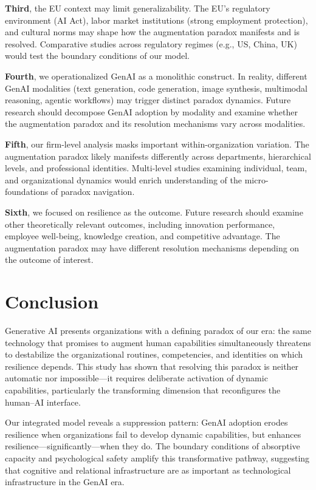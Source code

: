 \documentclass[12pt, a4paper]{article}
\begin{document}
\textbf{Third}, the EU context may limit generalizability. The EU's regulatory environment (AI Act), labor market institutions (strong employment protection), and cultural norms may shape how the augmentation paradox manifests and is resolved. Comparative studies across regulatory regimes (e.g., US, China, UK) would test the boundary conditions of our model.

\textbf{Fourth}, we operationalized GenAI as a monolithic construct. In reality, different GenAI modalities (text generation, code generation, image synthesis, multimodal reasoning, agentic workflows) may trigger distinct paradox dynamics. Future research should decompose GenAI adoption by modality and examine whether the augmentation paradox and its resolution mechanisms vary across modalities.

\textbf{Fifth}, our firm-level analysis masks important within-organization variation. The augmentation paradox likely manifests differently across departments, hierarchical levels, and professional identities. Multi-level studies examining individual, team, and organizational dynamics would enrich understanding of the micro-foundations of paradox navigation.

\textbf{Sixth}, we focused on resilience as the outcome. Future research should examine other theoretically relevant outcomes, including innovation performance, employee well-being, knowledge creation, and competitive advantage. The augmentation paradox may have different resolution mechanisms depending on the outcome of interest.


\section{Conclusion}

Generative AI presents organizations with a defining paradox of our era: the same technology that promises to augment human capabilities simultaneously threatens to destabilize the organizational routines, competencies, and identities on which resilience depends. This study has shown that resolving this paradox is neither automatic nor impossible---it requires deliberate activation of dynamic capabilities, particularly the transforming dimension that reconfigures the human--AI interface.

Our integrated model reveals a suppression pattern: GenAI adoption erodes resilience when organizations fail to develop dynamic capabilities, but enhances resilience---significantly---when they do. The boundary conditions of absorptive capacity and psychological safety amplify this transformative pathway, suggesting that cognitive and relational infrastructure are as important as technological infrastructure in the GenAI era.
\end{document}
